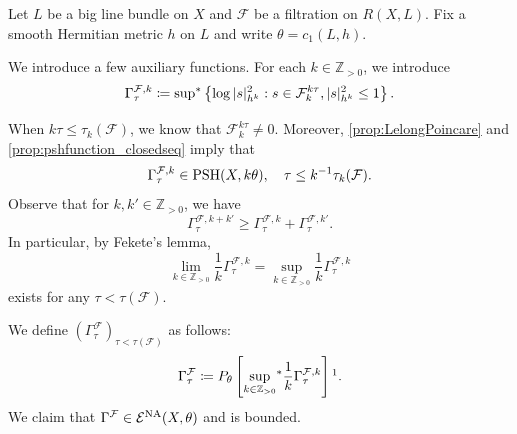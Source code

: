 \begin{example}\label{ex:RWN}
    Let $L$ be a big line bundle on $X$ and $\mathcal{F}$ be a filtration on $R(X,L)$. Fix a smooth Hermitian metric $h$ on $L$ and write $\theta=c_1(L,h)$.

    We introduce a few auxiliary functions. For each $k\in \mathbb{Z}_{>0}$, we introduce
    \[
    \Gamma^{\mathcal{F},k}_{\tau}\coloneqq \operatorname*{sup}_{}{}\!{}^{*} \left\{ \log |s|_{h^k}^2: s\in \mathcal{F}^{k\tau}_k, |s|_{h^k}^2\leq 1 \right\}.
    \]
    When $k\tau\leq \tau_k(\mathcal{F})$, we know that $\mathcal{F}_k^{k\tau}\neq 0$. Moreover, \cref{prop:LelongPoincare} and \cref{prop:pshfunction_closedseq} imply that
    \[
    \Gamma^{\mathcal{F},k}_{\tau}\in \mathrm{PSH}(X,k\theta),\quad \tau\leq k^{-1}\tau_k(\mathcal{F}).
    \]
    Observe that for $k,k'\in \mathbb{Z}_{>0}$, we have
    \[
    \Gamma^{\mathcal{F},k+k'}_{\tau}\geq \Gamma^{\mathcal{F},k}_{\tau}+\Gamma^{\mathcal{F},k'}_{\tau}.
    \]
    In particular, by Fekete's lemma,
    \begin{equation}\label{eq:limkGammaFk}
    \lim_{k\in \mathbb{Z}_{>0}}\frac{1}{k}\Gamma^{\mathcal{F},k}_{\tau}=\sup_{k\in \mathbb{Z}_{>0}}\frac{1}{k}\Gamma^{\mathcal{F},k}_{\tau}
    \end{equation}
    exists for any $\tau<\tau(\mathcal{F})$.

    We define $(\Gamma^{\mathcal{F}}_{\tau})_{\tau<\tau(\mathcal{F})}$ as follows:
    \[
    \Gamma^{\mathcal{F}}_{\tau}\coloneqq P_{\theta}\left[ \uscsup[k\in \mathbb{Z}_{>0}] \frac{1}{k} \Gamma^{\mathcal{F},k}_{\tau}\right]\footnotemark.
    \]
    We claim that $\Gamma^{\mathcal{F}}\in \mathcal{E}^{\mathrm{NA}}(X,\theta)$ and is bounded.


\end{example}
